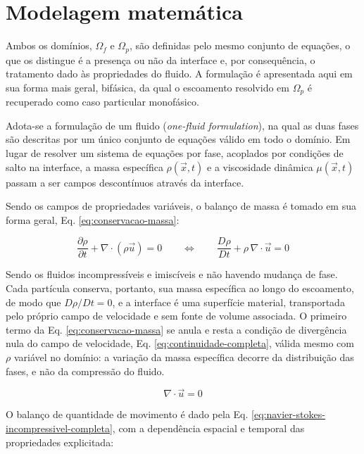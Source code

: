 \section{Modelagem matemática}
\label{sec:modelagem-matematica}

Ambos os domínios, $\Omega_f$ e $\Omega_p$, são definidas pelo mesmo conjunto de equações, o que os distingue é a presença ou não da interface e, por consequência, o tratamento dado às propriedades do fluido. A formulação é apresentada aqui em sua forma mais geral, bifásica, da qual o escoamento resolvido em $\Omega_p$ é recuperado como caso particular monofásico.

Adota-se a formulação de um fluido (\textit{one-fluid formulation}), na qual as duas fases são descritas por um único conjunto de equações válido em todo o domínio. Em lugar de resolver um sistema de equações por fase, acoplados por condições de salto na interface, a massa específica $\rho(\vec{x},t)$ e a viscosidade dinâmica $\mu(\vec{x},t)$ passam a ser campos descontínuos através da interface.

Sendo os campos de propriedades variáveis, o balanço de massa é tomado em sua forma geral, Eq. \ref{eq:conservacao-massa}:

\begin{equation}
    \frac{\partial \rho}{\partial t} + \nabla \cdot \left( \rho \vec{u} \right) = 0
    \qquad \Longleftrightarrow \qquad
    \frac{D \rho}{D t} + \rho \, \nabla \cdot \vec{u} = 0
    \label{eq:conservacao-massa}
\end{equation}

Sendo os fluidos incompressíveis e imiscíveis e não havendo mudança de fase. Cada partícula conserva, portanto, sua massa específica ao longo do escoamento, de modo que $D\rho / Dt = 0$, e a interface é uma superfície material, transportada pelo próprio campo de velocidade e sem fonte de volume associada. O primeiro termo da Eq. \ref{eq:conservacao-massa} se anula e resta a condição de divergência nula do campo de velocidade, Eq. \ref{eq:continuidade-completa}, válida mesmo com $\rho$ variável no domínio: a variação da massa específica decorre da distribuição das fases, e não da compressão do fluido. 

\begin{equation}
    \nabla \cdot \vec{u} = 0
    \label{eq:continuidade-completa}
\end{equation}

O balanço de quantidade de movimento é dado pela Eq. \ref{eq:navier-stokes-incompressivel-completa}, com a dependência espacial e temporal das propriedades explicitada:

